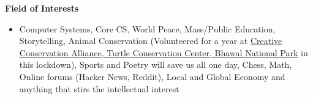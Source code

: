 \documentclass[letterpaper,10pt]{article}
\newcommand{\resheading}[1]{{\large \colorbox{mygrey}{\begin{minipage}{\textwidth}{\textbf{#1 \vphantom{p\^{E}}}}\end{minipage}}}}
\begin{document}
	\vspace{0.08in}
	
	\resheading{Field of Interests}
		\begin{itemize}
			\item Computer Systems, Core CS,  World Peace, Mass/Public Education, Storytelling, Animal Conservation (Volunteered for a year at \url{} \href{https://www.instagram.com/creativeconservationalliance/}{Creative Conservation Alliance, Turtle Conservation Center, Bhawal National Park} in this lockdown), Sports and Poetry will save us all one day, Chess, Math, Online forums (Hacker News, Reddit), Local and Global Economy and anything that stirs the intellectual interest
		\end{itemize}
\end{document}
